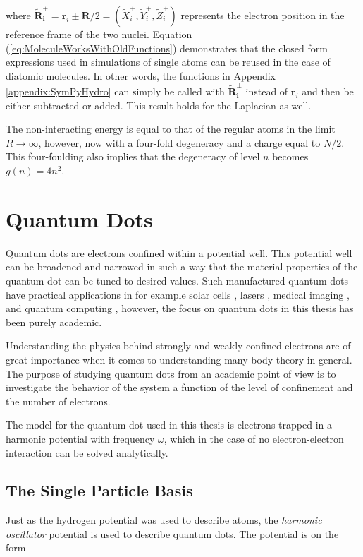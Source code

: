 where $\mathbf{\tilde R_i^\pm} = \mathbf{r}_i \pm \mathbf{R}/2 = (\tilde X_i^\pm, \tilde Y_i^\pm, \tilde Z_i^\pm)$ represents the electron position in the reference frame of the two nuclei. Equation (\ref{eq:MoleculeWorksWithOldFunctions}) demonstrates that the closed form expressions used in simulations of single atoms can be reused in the case of diatomic molecules. In other words, the functions in Appendix \ref{appendix:SymPyHydro} can simply be called  with $\mathbf{\tilde R_i^\pm}$ instead of $\mathbf{r}_i$ and then be either subtracted or added. This result holds for the Laplacian as well.

The non-interacting energy is equal to that of the regular atoms in the limit $R\to\infty$, however, now with a four-fold degeneracy and a charge equal to $N/2$. This four-foulding also implies that the degeneracy of level $n$ becomes $g(n) = 4n^2$.

\section{Quantum Dots}
\label{sec:modelQDots}

Quantum dots are electrons confined within a potential well. This potential well can be broadened and narrowed in such a way that the material properties of the quantum dot can be tuned to desired values. Such manufactured quantum dots have practical applications in for example solar cells \cite{QDOTS_SOLAR}, lasers \cite{QDOTS_LASER}, medical imaging \cite{QDOTS_MEDICINE}, and quantum computing \cite{QDOTS_QUANTUM}, however, the focus on quantum dots in this thesis has been purely academic.

Understanding the physics behind strongly and weakly confined electrons are of great importance when it comes to understanding many-body theory in general. The purpose of studying quantum dots from an academic point of view is to investigate the behavior of the system a function of the level of confinement and the number of electrons.

The model for the quantum dot used in this thesis is electrons trapped in a harmonic potential with frequency $\omega$, which in the case of no electron-electron interaction can be solved analytically. 

\subsection{The Single Particle Basis}

Just as the hydrogen potential was used to describe atoms, the \textit{harmonic oscillator} potential is used to describe quantum dots. The potential is on the form

